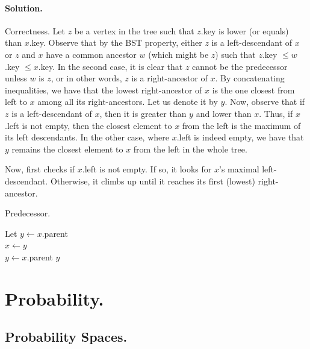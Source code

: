   \paragraph{Solution.} Correctness. Let $z$ be a vertex in the tree such that $z$.key is lower (or equals) than $x$.key. Observe that by the BST property, either $z$ is a left-descendant of $x$ or $z$ and $x$ have a common ancestor $w$ (which might be $z$) such that $z$.key $\le w$.key $\le x$.key. In the second case, it is clear that $z$ cannot be the predecessor unless $w$ is $z$, or in other words, $z$ is a right-ancestor of $x$. By concatenating inequalities, we have that the lowest right-ancestor of $x$ is the one closest from left to $x$ among all its right-ancestors. Let us denote it by $y$. Now, observe that if $z$ is a left-descendant of $x$, then it is greater than $y$ and lower than $x$. Thus, if $x$.left is not empty, then the closest element to $x$ from the left is the maximum of its left descendants. In the other case, where $x$.left is indeed empty, we have that $y$ remains the closest element to $x$ from the left in the whole tree.

 
  Now,  first checks if $x$.left is not empty. If so, it looks for $x$'s maximal left-descendant. Otherwise, it climbs up until it reaches its first (lowest) right-ancestor.

  
  \begin{algorithm}
\caption{Predecessor.} \label{alg:bst}
Let $y \leftarrow x$.parent \\
 {
    $x \leftarrow y$\\
    $y \leftarrow x$.parent
}
\Return $y$ 
\end{algorithm}
\fi
\ifdefined\Book
\fi



\newcommand{\image}{\text{ Im } }



\ifdefined\BOOK
\else
\setcounter{chapter}{6}
\fi
\section{Probability.} 

\subsection{ Probability Spaces. }


